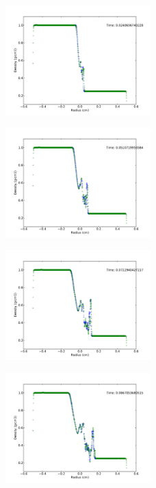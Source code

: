\documentclass[11pt,letterpaper]{article}
\begin{document}
\begin{figure}[bth]
\centering
\includegraphics[width=0.5\textwidth]{Shock-25.pdf}
\label{fig:simpleplot}
\end{figure}

\begin{figure}[bth]
\centering
\includegraphics[width=0.5\textwidth]{Shock-50.pdf}
\label{fig:simpleplot}
\end{figure}

\begin{figure}[bth]
\centering
\includegraphics[width=0.5\textwidth]{Shock-75.pdf}
\label{fig:simpleplot}
\end{figure}

\begin{figure}[bth]
\centering
\includegraphics[width=0.5\textwidth]{Shock-100.pdf}
\label{fig:simpleplot}
\end{figure}
\end{document}
